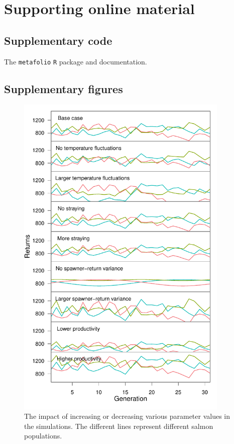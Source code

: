 \section{Supporting online material}

\subsection{Supplementary code}

The \texttt{metafolio} \texttt{R} package and documentation.

\subsection{Supplementary figures}

\begin{figure}[htbp]
\centering
\includegraphics[width=4.0in]{../examples/figure/plot-various-options-ts-3pops.pdf}
\caption{The impact of increasing or decreasing various parameter values in the 
simulations. The different lines represent different salmon populations.}
\label{f:eg-sens}
\end{figure}

